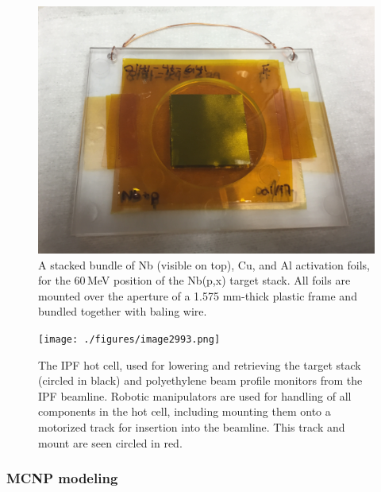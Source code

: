 \begin{figure}
 \centering
 \includegraphics[width=0.75\columnwidth]{./figures/IMG_1969.JPG}
 \caption{A stacked bundle of Nb (visible on top), Cu, and Al activation foils, for the 60\,MeV position of the Nb(p,x) target stack. All foils are mounted over the aperture of a 1.575 mm-thick plastic frame and bundled together with baling wire.}
 \label{fig:IMG_1969}
\end{figure}



\begin{figure}
 \centering
 \texttt{[image: ./figures/image2993.png]}
 \caption{The IPF hot cell, used for lowering and retrieving the target stack (circled in black) and polyethylene beam profile monitors from the IPF beamline. Robotic manipulators are used for handling of all components in the hot cell, including mounting them onto a motorized track for insertion into the beamline. This track and mount are seen circled in red.}
 \label{fig:IMG_1984}
\end{figure}



\subsubsection{MCNP modeling}




